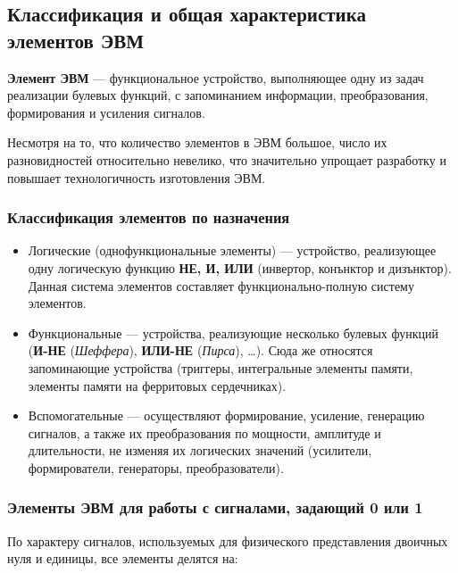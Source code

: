 \documentclass[10pt,a4paper,titlepage]{article}
\begin{document}
\subsection{Классификация и общая характеристика элементов ЭВМ}
\textbf{Элемент ЭВМ} --- функциональное устройство, выполняющее одну из задач реализации булевых функций, с запоминанием информации, преобразования, формирования и усиления сигналов.

Несмотря на то, что количество элементов в ЭВМ большое, число их разновидностей относительно невелико, что значительно упрощает разработку и повышает технологичность изготовления ЭВМ.

\subsubsection{Классификация элементов по назначения}

\begin{itemize}
\item Логические (однофункциональные элементы) --- устройство, реализующее одну логическую функцию \textbf{НЕ, И, ИЛИ} (инвертор, конънктор и дизънктор).
Данная система элементов составляет функционально-полную систему элементов.
\item Функциональные --- устройства, реализующие несколько булевых функций (\textbf{И-НЕ} (\textit{Шеффера}), \textbf{ИЛИ-НЕ} (\textit{Пирса}), \dots ).
Сюда же относятся запоминающие устройства (триггеры, интегральные элементы памяти, элементы памяти на ферритовых сердечниках).
\item Вспомогательные --- осуществляют формирование, усиление, генерацию сигналов, а также их преобразования по мощности, амплитуде и длительности, не изменяя их логических значений (усилители, формирователи, генераторы, преобразователи).
\end{itemize}

\subsubsection{Элементы ЭВМ для работы с сигналами, задающий 0 или 1}

По характеру сигналов, используемых для физического представления двоичных нуля и единицы, все элементы делятся на:
\end{document}
